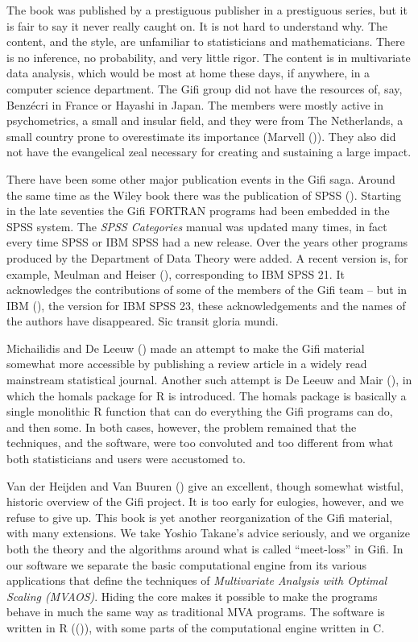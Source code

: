 \documentclass[
  12pt,
  letterpaper,
]{scrbook}
\begin{document}
The book was published by a prestiguous publisher in a prestiguous
series, but it is fair to say it never really caught on. It is not hard
to understand why. The content, and the style, are unfamiliar to
statisticians and mathematicians. There is no inference, no probability,
and very little rigor. The content is in multivariate data analysis,
which would be most at home these days, if anywhere, in a computer
science department. The Gifi group did not have the resources of, say,
Benzécri in France or Hayashi in Japan. The members were mostly active
in psychometrics, a small and insular field, and they were from The
Netherlands, a small country prone to overestimate its importance
(Marvell ()). They also did not have the
evangelical zeal necessary for creating and sustaining a large impact.

There have been some other major publication events in the Gifi saga.
Around the same time as the Wiley book there was the publication of SPSS
(). Starting in the late seventies the Gifi
FORTRAN programs had been embedded in the SPSS system. The \emph{SPSS
Categories} manual was updated many times, in fact every time SPSS or
IBM SPSS had a new release. Over the years other programs produced by
the Department of Data Theory were added. A recent version is, for
example, Meulman and Heiser (),
corresponding to IBM SPSS 21. It acknowledges the contributions of some
of the members of the Gifi team -- but in IBM
(), the version for IBM SPSS 23, these
acknowledgements and the names of the authors have disappeared. Sic
transit gloria mundi.

Michailidis and De Leeuw ()
made an attempt to make the Gifi material somewhat more accessible by
publishing a review article in a widely read mainstream statistical
journal. Another such attempt is De Leeuw and Mair
(), in which the homals package
for R is introduced. The homals package is basically a single monolithic
R function that can do everything the Gifi programs can do, and then
some. In both cases, however, the problem remained that the techniques,
and the software, were too convoluted and too different from what both
statisticians and users were accustomed to.

Van der Heijden and Van Buuren
() give an excellent,
though somewhat wistful, historic overview of the Gifi project. It is
too early for eulogies, however, and we refuse to give up. This book is
yet another reorganization of the Gifi material, with many extensions.
We take Yoshio Takane's advice seriously, and we organize both the
theory and the algorithms around what is called ``meet-loss'' in Gifi.
In our software we separate the basic computational engine from its
various applications that define the techniques of \emph{Multivariate
Analysis with Optimal Scaling (MVAOS)}. Hiding the core makes it
possible to make the programs behave in much the same way as traditional
MVA programs. The software is written in R
(()), with
some parts of the computational engine written in C.
\end{document}
